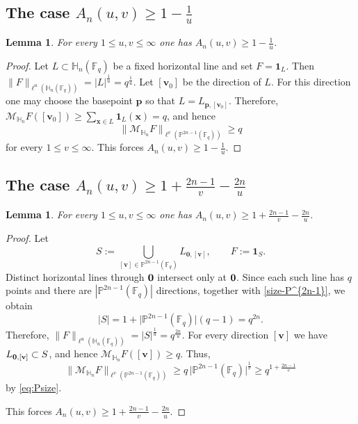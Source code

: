 \documentclass[11pt]{article}
\newtheorem{lemma}[theorem]{Lemma}
\newcommand{\1}{\mathbf 1}
\newcommand{\bfp}{\mathbf{p}}
\begin{document}
\subsection{The case $A_n(u,v)\ge 1-\frac1u$}
\begin{lemma}\label{lem:Hn_lower_2}
For every $1\le u,v\le \infty$ one has $A_n(u,v)\ge 1-\frac1u$.
\end{lemma}

\begin{proof}
Let $L\subset \mathbb{H}_n(\mathbb{F}_q)$ be a fixed horizontal line and set $F=\mathbf{1}_L$.
Then $\|F\|_{\ell^u(\mathbb{H}_n(\mathbb{F}_q))}=|L|^{\frac{1}{u}}=q^{\frac{1}{u}}$.
Let $[\mathbf v_0]$ be the direction of $L$.
For this direction one may choose the basepoint $\bfp$ so that $L=L_{\mathbf p, [\mathbf v_0]}$.
Therefore, $\mathcal{M}_{\mathbb{H}_n}F([\mathbf v_0])\ge \sum\limits_{\mathbf x\in L}\mathbf{1}_L(\mathbf x)=q$, and hence
\[
\|\mathcal{M}_{\mathbb{H}_n}F\|_{\ell^v(\mathbb{P}^{2n-1}(\mathbb{F}_q))}\ge q
\]
 for every $1\le v\le\infty$.
This forces $A_n(u,v)\ge 1-\frac1u$.
\end{proof}








\subsection{The case $A_n(u,v)\ge 1+\frac{2n-1}{v}-\frac{2n}{u}$}
\begin{lemma}\label{lem:Hn_lower_3}
For every $1\le u,v\le \infty$ one has $A_n(u,v)\ge 1+\frac{2n-1}{v}-\frac{2n}{u}$.
\end{lemma}

\begin{proof}
Let
\[
S:=\bigcup_{[\mathbf{v}]\in \mathbb{P}^{2n-1}(\mathbb{F}_q)} L_{\mathbf{0}, [\mathbf{v}]},
\qquad
F:=\mathbf{1}_S.
\]
Distinct horizontal lines through $\bf0$ intersect only at $\bf0$.
Since each such line has $q$ points and there are $|\mathbb{P}^{2n-1}(\mathbb{F}_q)|$ directions, together with \eqref{size-P^{2n-1}}, we obtain
\[
|S|
=
1+\bigl|\mathbb{P}^{2n-1}(\mathbb{F}_q)\bigr|(q-1)
=
q^{2n}.
\]
Therefore, $\|F\|_{\ell^u(\mathbb{H}_n(\mathbb{F}_q))}=|S|^{\frac{1}{u}}=q^{\frac{2n}{u}}$.
For every direction $[\mathbf{v}]$ we have $L_{\bf0, [\mathbf{v}]}\subset S$, and hence $\mathcal{M}_{\mathbb{H}_n}F([\mathbf{v}])\ge q$.
Thus,
\[
\|\mathcal{M}_{\mathbb{H}_n}F\|_{\ell^v(\mathbb{P}^{2n-1}(\mathbb{F}_q))}
\ge
q\, \bigl|\mathbb{P}^{2n-1}(\mathbb{F}_q)\bigr|^{\frac{1}{v}}
\geq
q^{1+\frac{2n-1}{v}}
\]
by \eqref{eq:Psize}.

This forces $A_n(u,v)\ge 1+\frac{2n-1}{v}-\frac{2n}{u}$.
\end{proof}
\end{document}

